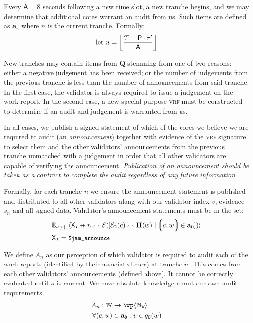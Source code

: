 Every $\mathsf{A} = 8$ seconds following a new time slot, a new tranche begins, and we may determine that additional cores warrant an audit from us. Such items are defined as $\mathbf{a}_n$ where $n$ is the current tranche. Formally:
\begin{equation}
  \using n = \ffrac{\mathcal{T} - \mathsf{P}\cdot\tau'}{\mathsf{A}}
\end{equation}

New tranches may contain items from $\mathbf{Q}$ stemming from one of two reasons: either a negative judgement has been received; or the number of judgements from the previous tranche is less than the number of announcements from said tranche. In the first case, the validator is always required to issue a judgement on the work-report. In the second case, a new special-purpose \textsc{vrf} must be constructed to determine if an audit and judgement is warranted from us.

In all cases, we publish a signed statement of which of the cores we believe we are required to audit (an \emph{announcement}) together with evidence of the \textsc{vrf} signature to select them and the other validators' announcements from the previous tranche unmatched with a judgement in order that all other validators are capable of verifying the announcement. \emph{Publication of an announcement should be taken as a contract to complete the audit regardless of any future information.}

Formally, for each tranche $n$ we ensure the announcement statement is published and distributed to all other validators along with our validator index $v$, evidence $s_n$ and all signed data. Validator's announcement statements must be in the set:
\begin{align}
  &\sig{\kappa[v]_e}{\mathsf{X}_I \doubleplus n \concat \se([\se_2(c) \frown \mathbf{H}(w) \mid \tup{c, w} \in \mathbf{a}_0])} \\
  &\mathsf{X}_I = \token{\$jam\_announce}
\end{align}

We define $A_n$ as our perception of which validator is required to audit each of the work-reports (identified by their associated core) at tranche $n$. This comes from each other validators' announcements (defined above). It cannot be correctly evaluated until $n$ is current. We have absolute knowledge about our own audit requirements.
\begin{align}
  A_n: \mathbb{W} &\to \powset{\N_\mathsf{V}} \\
  \forall (c, w) &\in \mathbf{a}_0 : v \in q_0(w)
\end{align}

